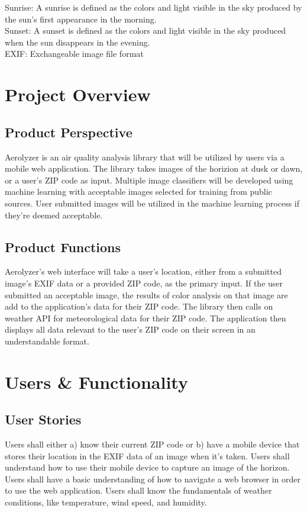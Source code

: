 \documentclass[journal,10pt,draftclsnofoot,onecolumn]{IEEEtran}
\begin{document}
\begin{singlespace}
Sunrise: A sunrise is defined as the colors and light visible in the sky produced by the sun's first appearance in the morning.\\

Sunset: A sunset is defined as the colors and light visible in the sky produced when the sun disappears in the evening.\\

EXIF: Exchangeable image file format \\

\section{Project Overview}

\subsection{Product Perspective}
Aerolyzer is an air quality analysis library that will be utilized by users via a mobile web application. The library takes images of the horizion at dusk or dawn, or a user’s ZIP code as input. Multiple image classifiers will be developed using machine learning with acceptable images selected for training from public sources. User submitted images will be utilized in the machine learning process if they’re deemed acceptable. 

\subsection{Product Functions}
Aerolyzer’s web interface will take a user’s location, either from a submitted image’s EXIF data or a provided ZIP code, as the primary input. If the user submitted an acceptable image, the results of color analysis on that image are add to the application’s data for their ZIP code. The library then calls on weather API for meteorological data for their ZIP code. The application then displays all data relevant to the user’s ZIP code on their screen in an understandable format.

\section{Users \& Functionality}
\subsection{User Stories}
Users shall either a) know their current ZIP code or b) have a mobile device that stores their location in the EXIF data of an image when it’s taken.
Users shall understand how to use their mobile device to capture an image of the horizon.
Users shall have a basic understanding of how to navigate a web browser in order to use the web application.
Users shall know the fundamentals of weather conditions, like temperature, wind speed, and humidity.


\end{singlespace}
\end{document}
